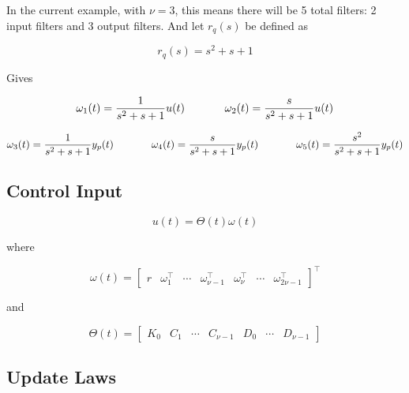 In the current example, with $\nu=3$, this means there will be 5 total filters: 2 input filters and 3 output filters.
And let $r_{q}(s)$ be defined as

\begin{equation*}
  r_{q}(s) = s^{2} + s + 1
\end{equation*}

Gives

\begin{equation*}
  \omega_{1}(t) = \frac{1}{s^{2} + s + 1}u(t)
  \hspace{0.5in}
  \omega_{2}(t) = \frac{s}{s^{2} + s + 1}u(t)
\end{equation*}

\begin{equation*}
  \omega_{3}(t) = \frac{1}{s^{2} + s + 1}y_{p}(t)
  \hspace{0.5in}
  \omega_{4}(t) = \frac{s}{s^{2} + s + 1}y_{p}(t)
  \hspace{0.5in}
  \omega_{5}(t) = \frac{s^{2}}{s^{2} + s + 1}y_{p}(t)
\end{equation*}



\subsection{Control Input}

\begin{equation*}
  u(t) = \Theta(t)\omega(t)
\end{equation*}

where

\begin{equation*}
  \omega(t) =
  \begin{bmatrix}
    r & \omega_{1}^{\top} & \cdots & \omega_{\nu-1}^{\top} & \omega_{\nu}^{\top} & \cdots & \omega_{2\nu-1}^{\top}
  \end{bmatrix}^{\top}
\end{equation*}

and

\begin{equation*}
  \Theta(t) =
  \begin{bmatrix}
    K_{0} & C_{1} & \cdots & C_{\nu-1} & D_{0} & \cdots & D_{\nu-1}
  \end{bmatrix}
\end{equation*}

\subsection{Update Laws}

